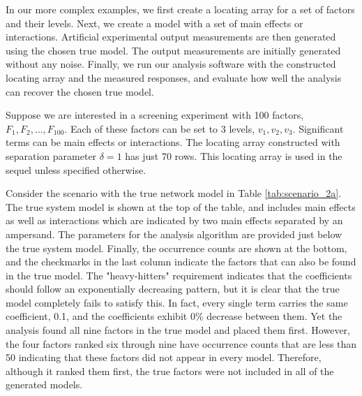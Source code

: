 In our more complex examples, we first create a locating array for a set of factors and their levels.
Next, we create a model with a set of main effects or interactions.
Artificial experimental output measurements are then generated using the chosen true model.
The output measurements are initially generated without any noise.
Finally, we run our analysis software with the constructed locating array and the measured responses, and evaluate how well the analysis can recover the chosen true model.

Suppose we are interested in a screening experiment with 100 factors, $F_{1}, F_{2}, \dots, F_{100}$.
Each of these factors can be set to 3 levels, $v_1, v_2, v_3$.
Significant terms can be main effects or interactions.
The locating array constructed with separation parameter $\delta=1$ has just 70 rows.
This locating array is used in the sequel unless specified otherwise.

Consider the scenario with the true network model in Table \ref{tab:scenario_2a}.
The true system model is shown at the top of the table, and includes main effects as well as interactions which are indicated by two main effects separated by an ampersand.
The parameters for the analysis algorithm are provided just below the true system model.
Finally, the occurrence counts are shown at the bottom, and the checkmarks in the last column indicate the factors that can also be found in the true model.
The "heavy-hitters" requirement indicates that the coefficients should follow an exponentially decreasing pattern, but it is clear that the true model completely fails to satisfy this.
In fact, every single term carries the same coefficient, 0.1, and the coefficients exhibit 0\% decrease between them.
Yet the analysis found all nine factors in the true model and placed them first.
However, the four factors ranked six through nine have occurrence counts that are less than 50 indicating that these factors did not appear in every model.
Therefore, although it ranked them first, the true factors were not included in all of the generated models.

